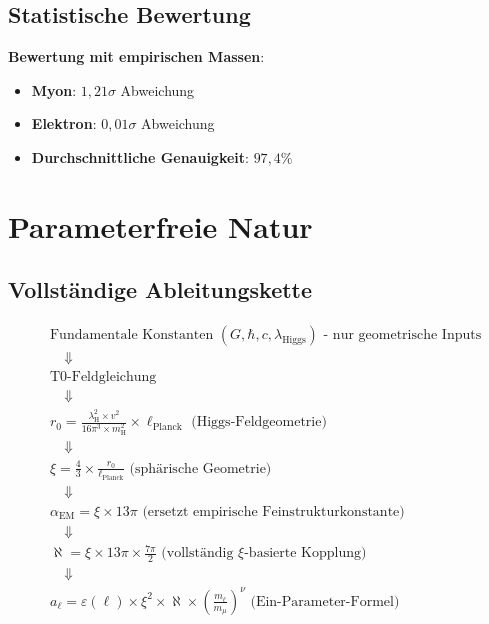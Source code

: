 \documentclass[12pt,a4paper]{article}
\newcommand{\xipar}{\xi}
\newcommand{\alphagem}{\alpha_{\text{EM}}}
\newcommand{\lambdaH}{\lambda_{\text{H}}}
\newcommand{\ellPlanck}{\ell_{\text{Planck}}}
\newcommand{\rzero}{r_0}
\newcommand{\nulep}{\nu}
\newcommand{\epsilonlep}{\varepsilon}
\newcommand{\sigmadev}{\sigma}
\begin{document}
	\subsection{Statistische Bewertung}
	
	\textbf{Bewertung mit empirischen Massen}:
	\begin{itemize}
		\item \textbf{Myon}: $1{,}21\sigmadev$ Abweichung
		\item \textbf{Elektron}: $0{,}01\sigmadev$ Abweichung
		\item \textbf{Durchschnittliche Genauigkeit}: $97{,}4\%$
	\end{itemize}
	
	\section{Parameterfreie Natur}
	
	\subsection{Vollst\"andige Ableitungskette}
	
	\begin{align}
		&\text{Fundamentale Konstanten } (G, \hbar, c, \lambda_{\text{Higgs}}) \text{ - nur geometrische Inputs} \\
		&\quad \Downarrow \\
		&\text{T0-Feldgleichung} \\
		&\quad \Downarrow \\
		&\rzero = \frac{\lambdaH^2 \times v^2}{16\pi^3 \times m_{\text{H}}^2} \times \ellPlanck \text{ (Higgs-Feldgeometrie)} \\
		&\quad \Downarrow \\
		&\xipar = \frac{4}{3} \times \frac{\rzero}{\ellPlanck} \text{ (sph\"arische Geometrie)} \\
		&\quad \Downarrow \\
		&\alphagem = \xipar \times 13\pi \text{ (ersetzt empirische Feinstrukturkonstante)} \\
		&\quad \Downarrow \\
		&\aleph = \xipar \times 13\pi \times \frac{7\pi}{2} \text{ (vollst\"andig $\xipar$-basierte Kopplung)} \\
		&\quad \Downarrow \\
		&a_\ell = \epsilonlep(\ell) \times \xipar^2 \times \aleph \times \left(\frac{m_\ell}{m_\mu}\right)^\nulep \text{ (Ein-Parameter-Formel)}
	\end{align}
	
\end{document}

